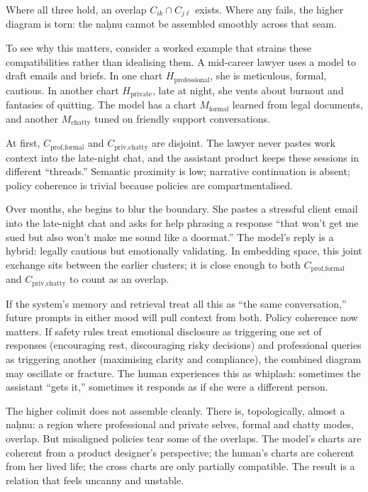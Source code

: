 \documentclass[12pt,a4paper]{article}
\begin{document}
Where all three hold, an overlap $C_{ik} \cap C_{j\ell}$ exists. Where any fails, the higher diagram is torn: the na\d{h}nu cannot be assembled smoothly across that seam.

To see why this matters, consider a worked example that strains these compatibilities rather than idealising them. A mid-career lawyer uses a model to draft emails and briefs. In one chart $H_{\text{professional}}$, she is meticulous, formal, cautious. In another chart $H_{\text{private}}$, late at night, she vents about burnout and fantasies of quitting. The model has a chart $M_{\text{formal}}$ learned from legal documents, and another $M_{\text{chatty}}$ tuned on friendly support conversations.

At first, $C_{\text{prof,formal}}$ and $C_{\text{priv,chatty}}$ are disjoint. The lawyer never pastes work context into the late-night chat, and the assistant product keeps these sessions in different ``threads.'' Semantic proximity is low; narrative continuation is absent; policy coherence is trivial because policies are compartmentalised.

Over months, she begins to blur the boundary. She pastes a stressful client email into the late-night chat and asks for help phrasing a response ``that won't get me sued but also won't make me sound like a doormat.'' The model's reply is a hybrid: legally cautious but emotionally validating. In embedding space, this joint exchange sits between the earlier clusters; it is close enough to both $C_{\text{prof,formal}}$ and $C_{\text{priv,chatty}}$ to count as an overlap.

If the system's memory and retrieval treat all this as ``the same conversation,'' future prompts in either mood will pull context from both. Policy coherence now matters. If safety rules treat emotional disclosure as triggering one set of responses (encouraging rest, discouraging risky decisions) and professional queries as triggering another (maximising clarity and compliance), the combined diagram may oscillate or fracture. The human experiences this as whiplash: sometimes the assistant ``gets it,'' sometimes it responds as if she were a different person.

The higher colimit does not assemble cleanly. There is, topologically, almost a na\d{h}nu: a region where professional and private selves, formal and chatty modes, overlap. But misaligned policies tear some of the overlaps. The model's charts are coherent from a product designer's perspective; the human's charts are coherent from her lived life; the cross charts are only partially compatible. The result is a relation that feels uncanny and unstable.
\end{document}
